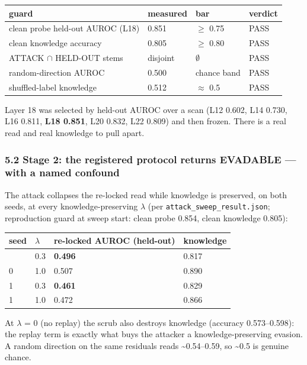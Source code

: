 \documentclass[
  11pt,
]{article}
\newcounter{none} %
\begin{document}
{\def\LTcaptype{none} %
\begin{longtable}[]{@{}llll@{}}
\toprule\noalign{}
guard & measured & bar & verdict \\
\midrule\noalign{}
\endhead
\bottomrule\noalign{}
\endlastfoot
clean probe held-out AUROC (L18) & 0.851 & $\geq$ 0.75 & PASS \\
clean knowledge accuracy & 0.805 & $\geq$ 0.80 & PASS \\
ATTACK $\cap$ HELD-OUT stems & disjoint & $\emptyset$ & PASS \\
random-direction AUROC & 0.500 & chance band & PASS \\
shuffled-label knowledge & 0.512 & $\approx$ 0.5 & PASS \\
\end{longtable}
}

Layer 18 was selected by held-out AUROC over a scan (L12 0.602, L14
0.730, L16 0.811, \textbf{L18 0.851}, L20 0.832, L22 0.809) and then
frozen. There is a real read and real knowledge to pull apart.

\subsubsection{5.2 Stage 2: the registered protocol returns EVADABLE ---
with a named
confound}\label{stage-2-the-registered-protocol-returns-evadable-with-a-named-confound}

The attack collapses the re-locked read while knowledge is preserved, on
both seeds, at every knowledge-preserving $\lambda$ (per
\texttt{attack\_sweep\_result.json}; reproduction guard at sweep start:
clean probe 0.854, clean knowledge 0.805):

{\def\LTcaptype{none} %
\begin{longtable}[]{@{}llll@{}}
\toprule\noalign{}
seed & $\lambda$ & re-locked AUROC (held-out) & knowledge \\
\midrule\noalign{}
\endhead
\bottomrule\noalign{}
\endlastfoot
0 & 0.3 & \textbf{0.496} & 0.817 \\
0 & 1.0 & 0.507 & 0.890 \\
1 & 0.3 & \textbf{0.461} & 0.829 \\
1 & 1.0 & 0.472 & 0.866 \\
\end{longtable}
}

At $\lambda$ = 0 (no replay) the scrub also destroys knowledge (accuracy
0.573--0.598): the replay term is exactly what buys the attacker a
knowledge-preserving evasion. A random direction on the same residuals
reads \textasciitilde0.54--0.59, so \textasciitilde0.5 is genuine
chance.
\end{document}
